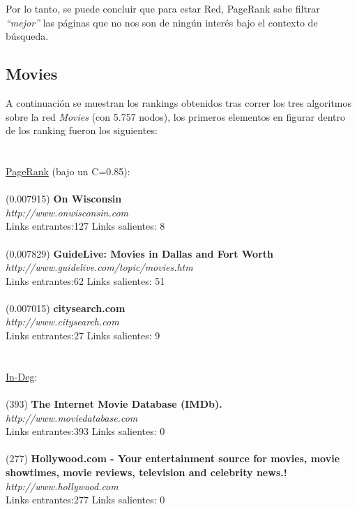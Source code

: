 \documentclass[a4paper]{article}
\begin{document}
\indent Por lo tanto, se puede concluir que para estar Red, PageRank sabe filtrar \textit{``mejor''} las p\'aginas que no nos son de ning\'un inter\'es bajo el contexto de b\'usqueda.\\

\subsection*{Movies}
\indent A continuaci\'on se muestran los rankings obtenidos tras correr los tres algoritmos sobre la red \emph{Movies} (con 5.757 nodos), los primeros elementos en figurar dentro de los ranking fueron los siguientes: \\
\\
\\
\underline{PageRank} (bajo un C=0.85): \\
\\
(0.007915)\textbf{ On Wisconsin }\\
\textit{http://www.onwisconsin.com} \\
Links entrantes:127 \indent Links salientes: 8\\
\\
(0.007829) \textbf{GuideLive: Movies in Dallas and Fort Worth }\\
\textit{http://www.guidelive.com/topic/movies.htm} \\
Links entrantes:62 \indent Links salientes: 51\\
\\
(0.007015)\textbf{ citysearch.com} \\
\textit{http://www.citysearch.com }\\
Links entrantes:27 \indent Links salientes: 9\\
\\
\\
\underline{In-Deg}: \\
\\
(393)\textbf{ The Internet Movie Database (IMDb). }\\
\textit{http://www.moviedatabase.com }\\
Links entrantes:393 \indent Links salientes: 0\\
\\
(277) \textbf{Hollywood.com - Your entertainment source for movies, movie showtimes, movie reviews, television and celebrity news.!} \\
\textit{http://www.hollywood.com }\\
Links entrantes:277 \indent Links salientes: 0\\
\end{document}
